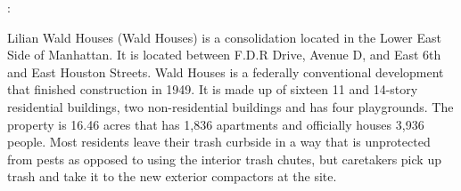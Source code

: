 : 

Lilian Wald  Houses (Wald Houses) is a consolidation located in the Lower East Side of Manhattan. It is located between F.D.R Drive, Avenue D, and East 6th and East Houston Streets. Wald Houses is a federally conventional development that finished construction in 1949. It is made up of sixteen 11 and 14-story residential buildings, two non-residential buildings and has four playgrounds. The property is 16.46 acres that has 1,836 apartments and officially houses 3,936 people. Most residents leave their trash curbside in a way that is unprotected from pests as opposed to using the interior trash chutes, but caretakers pick up trash and take it to the new exterior compactors at the site.  

 